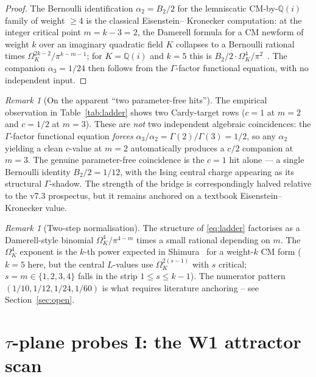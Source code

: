 \documentclass[a4paper,11pt]{article}
\newcommand{\OmK}{\Omega_K}
\newcommand{\Qi}{\mathbb{Q}(i)}
\theoremstyle{definition}
\theoremstyle{remark}
\newtheorem{remark}[theorem]{Remark}
\begin{document}
\begin{proof}
The Bernoulli identification $\alpha_2 = B_2/2$ for the lemniscatic
CM-by-$\Qi$ family of weight $\geq 4$ is the classical Eisenstein--%
Kronecker computation: at the integer critical point $m = k-3 = 2$,
the Damerell formula for a CM newform of weight $k$ over an imaginary
quadratic field $K$ collapses to a Bernoulli rational times
$\OmK^{2k-2}/\pi^{k-m-1}$; for $K = \Qi$ and $k=5$ this is
$B_2/2 \cdot \OmK^{4}/\pi^{2}$~\cite{Damerell71,Shimura76,HS86}.
The companion $\alpha_3 = 1/24$ then follows from the
$\Gamma$-factor functional equation, with no independent input.
\end{proof}

\begin{remark}[On the apparent ``two parameter-free hits'']
The empirical observation in Table~\ref{tab:ladder} shows two
Cardy-target rows ($c=1$ at $m=2$ and $c=1/2$ at $m=3$).  These are
\emph{not} two independent algebraic coincidences: the
$\Gamma$-factor functional equation \emph{forces} $\alpha_3 / \alpha_2
= \Gamma(2)/\Gamma(3) = 1/2$, so any $\alpha_2$ yielding a clean
$c$-value at $m=2$ automatically produces a $c/2$ companion at $m=3$.
The genuine parameter-free coincidence is the $c=1$ hit alone --- a
single Bernoulli identity $B_2/2 = 1/12$, with the Ising central
charge appearing as its structural $\Gamma$-shadow.  The strength of
the bridge is correspondingly halved relative to the v7.3 prospectus,
but it remains anchored on a textbook Eisenstein--Kronecker value.
\end{remark}

\begin{remark}[Two-step normalisation]
The structure of \eqref{eq:ladder} factorises as a Damerell-style
binomial $\OmK^{4}/\pi^{4-m}$ times a small rational depending on $m$.
The $\OmK^{4}$ exponent is the $k$-th power expected in
Shimura~\cite{Shimura76} for a weight-$k$ CM form ($k=5$ here, but
the central $L$-values use $\OmK^{2(s-1)}$ with $s$ critical;
$s=m\in\{1,2,3,4\}$ falls in the strip $1\le s\le k-1$).
The numerator pattern $(1/10,1/12,1/24,1/60)$ is what requires
literature anchoring -- see Section~\ref{sec:open}.
\end{remark}

\section{$\tau$-plane probes I: the W1 attractor scan}
\label{sec:W1}
\end{document}
